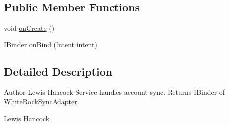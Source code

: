 \subsection*{Public Member Functions}
\begin{DoxyCompactItemize}
\item 
void \hyperlink{classuk_1_1ac_1_1swan_1_1digitaltrails_1_1sync_1_1_white_rock_sync_service_aab9d11343cac69ee35c8c99bae47e533}{on\+Create} ()
\item 
I\+Binder \hyperlink{classuk_1_1ac_1_1swan_1_1digitaltrails_1_1sync_1_1_white_rock_sync_service_a14e4c77debaf267eeca8093bcdc364ae}{on\+Bind} (Intent intent)
\end{DoxyCompactItemize}


\subsection{Detailed Description}
\begin{DoxyAuthor}{Author}
Lewis Hancock Service handles account sync. Returns I\+Binder of \hyperlink{classuk_1_1ac_1_1swan_1_1digitaltrails_1_1sync_1_1_white_rock_sync_adapter}{White\+Rock\+Sync\+Adapter}.

Lewis Hancock 
\end{DoxyAuthor}


